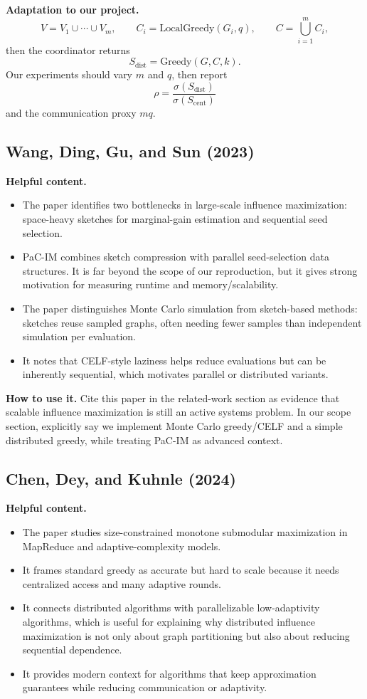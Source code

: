 \documentclass[10pt]{article}
\begin{document}
\textbf{Adaptation to our project.}
\[
    V=V_1\cup\cdots\cup V_m,\qquad
    C_i=\text{LocalGreedy}(G_i,q),\qquad
    C=\bigcup_{i=1}^{m}C_i,
\]
then the coordinator returns
\[
    S_{\mathrm{dist}}=\text{Greedy}(G,C,k).
\]
Our experiments should vary $m$ and $q$, then report
\[
    \rho=\frac{\sigma(S_{\mathrm{dist}})}{\sigma(S_{\mathrm{cent}})}
\]
and the communication proxy $mq$.

\subsection{Wang, Ding, Gu, and Sun (2023)}

\textbf{Helpful content.}
\begin{itemize}
\item The paper identifies two bottlenecks in large-scale influence
maximization: space-heavy sketches for marginal-gain estimation and sequential
seed selection.
\item PaC-IM combines sketch compression with parallel seed-selection data
structures. It is far beyond the scope of our reproduction, but it gives strong
motivation for measuring runtime and memory/scalability.
\item The paper distinguishes Monte Carlo simulation from sketch-based methods:
sketches reuse sampled graphs, often needing fewer samples than independent
simulation per evaluation.
\item It notes that CELF-style laziness helps reduce evaluations but can be
inherently sequential, which motivates parallel or distributed variants.
\end{itemize}

\textbf{How to use it.} Cite this paper in the related-work section as evidence
that scalable influence maximization is still an active systems problem. In our
scope section, explicitly say we implement Monte Carlo greedy/CELF and a simple
distributed greedy, while treating PaC-IM as advanced context.

\subsection{Chen, Dey, and Kuhnle (2024)}

\textbf{Helpful content.}
\begin{itemize}
\item The paper studies size-constrained monotone submodular maximization in
MapReduce and adaptive-complexity models.
\item It frames standard greedy as accurate but hard to scale because it needs
centralized access and many adaptive rounds.
\item It connects distributed algorithms with parallelizable low-adaptivity
algorithms, which is useful for explaining why distributed influence
maximization is not only about graph partitioning but also about reducing
sequential dependence.
\item It provides modern context for algorithms that keep approximation
guarantees while reducing communication or adaptivity.
\end{itemize}
\end{document}
